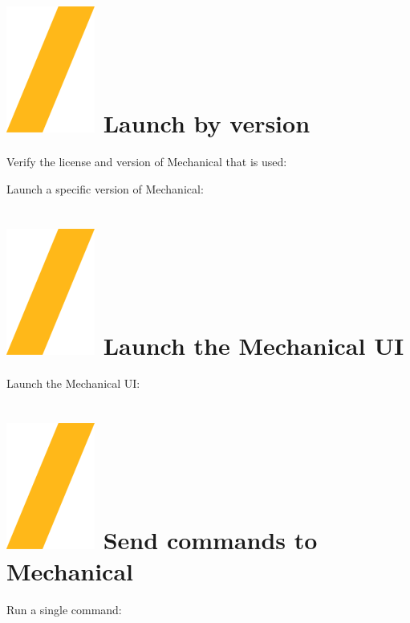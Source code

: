 \documentclass[9pt,landscape]{article}
\begin{document}
\begin{multicols}{3}
\section{\includegraphics[height=\fontcharht\font`\S]{slash.png} Launch by version}

Verify the license and version of Mechanical that is used:


Launch a specific version of Mechanical:






\section{\includegraphics[height=\fontcharht\font`\S]{slash.png} Launch the  Mechanical UI}

Launch the  Mechanical UI:


\vfill

\section{\includegraphics[height=\fontcharht\font`\S]{slash.png} Send commands to Mechanical}
Run a single command:


\end{multicols}
\end{document}
